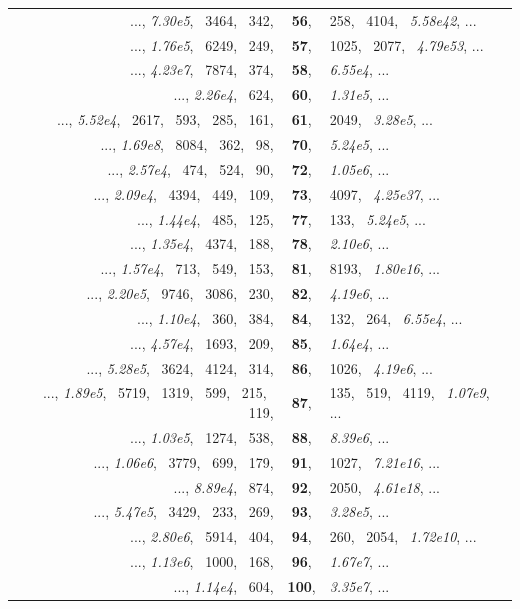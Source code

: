 \documentclass[12pt,reqno]{article}
\begin{document}
\begin{center}
\begin{tabular}{rcl}
  ..., \textit{7.30e5}, \, 3464, \, 342, & \textbf{56}, & 258, \, 4104, \, \textit{5.58e42}, ... \\
  ..., \textit{1.76e5}, \, 6249, \, 249, & \textbf{57}, & 1025, \, 2077, \, \textit{4.79e53}, ... \\
  ..., \textit{4.23e7}, \, 7874, \, 374,& \textbf{58}, & \textit{6.55e4}, ... \\
  ..., \textit{2.26e4}, \, 624, & \textbf{60}, & \textit{1.31e5}, ... \\
  ..., \textit{5.52e4}, \, 2617, \, 593, \, 285, \, 161, & \textbf{61}, & 2049, \, \textit{3.28e5}, ... \\
  ..., \textit{1.69e8}, \, 8084, \, 362, \, 98, & \textbf{70}, & \textit{5.24e5}, ... \\
  ..., \textit{2.57e4}, \, 474, \, 524, \, 90, & \textbf{72}, & \textit{1.05e6}, ... \\
  ..., \textit{2.09e4}, \, 4394, \, 449, \, 109, & \textbf{73}, & 4097, \, \textit{4.25e37}, ... \\
  ..., \textit{1.44e4}, \, 485, \, 125, & \textbf{77}, & 133, \, \textit{5.24e5}, ... \\
  ..., \textit{1.35e4}, \, 4374, \, 188, & \textbf{78}, & \textit{2.10e6}, ... \\
  ..., \textit{1.57e4}, \, 713, \, 549, \, 153, & \textbf{81}, & 8193, \, \textit{1.80e16}, ... \\
  ..., \textit{2.20e5}, \, 9746, \, 3086, \, 230, & \textbf{82}, & \textit{4.19e6}, ... \\
  ..., \textit{1.10e4}, \, 360, \, 384, & \textbf{84}, & 132, \, 264, \, \textit{6.55e4}, ... \\
  ..., \textit{4.57e4}, \, 1693, \, 209, & \textbf{85}, & \textit{1.64e4}, ... \\
  ..., \textit{5.28e5}, \, 3624, \, 4124, \, 314, & \textbf{86}, & 1026, \, \textit{4.19e6}, ... \\
  ..., \textit{1.89e5}, \, 5719, \, 1319, \, 599, \, 215, \, 119, & \textbf{87}, & 135, \, 519, \, 4119, \, \textit{1.07e9}, ... \\
  ..., \textit{1.03e5}, \, 1274, \, 538, & \textbf{88}, & \textit{8.39e6}, ... \\
  ..., \textit{1.06e6}, \, 3779, \, 699, \, 179, & \textbf{91}, & 1027, \, \textit{7.21e16}, ... \\
  ..., \textit{8.89e4}, \, 874, & \textbf{92}, & 2050, \, \textit{4.61e18}, ... \\
  ..., \textit{5.47e5}, \, 3429, \, 233, \, 269, & \textbf{93}, & \textit{3.28e5}, ... \\
  ..., \textit{2.80e6}, \, 5914, \, 404, & \textbf{94}, & 260, \, 2054, \, \textit{1.72e10}, ... \\
  ..., \textit{1.13e6}, \, 1000, \, 168, & \textbf{96}, & \textit{1.67e7}, ... \\
  ..., \textit{1.14e4}, \, 604, & \textbf{100}, & \textit{3.35e7}, ... \\
  \hline
\end{tabular} \end{center}
\end{document}

